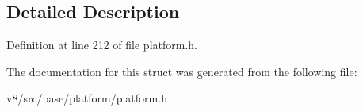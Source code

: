 \subsection{Detailed Description}


Definition at line 212 of file platform.\+h.



The documentation for this struct was generated from the following file\+:\begin{DoxyCompactItemize}
\item 
v8/src/base/platform/platform.\+h\end{DoxyCompactItemize}
